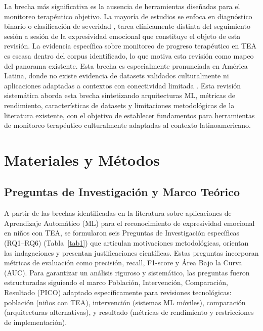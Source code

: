 \documentclass[ASNA,twocolumn]{USG}
\begin{document}
	La brecha más significativa es la ausencia de herramientas diseñadas para el
	monitoreo terapéutico objetivo. La mayoría de estudios se enfoca en diagnóstico
	binario o clasificación de severidad \cite{Alsubai2025}, tarea clínicamente distinta
	del seguimiento sesión a sesión de la expresividad emocional que constituye el objeto
	de esta revisión. La evidencia específica sobre monitoreo de progreso terapéutico en
	TEA es escasa dentro del corpus identificado, lo que motiva esta revisión como mapeo
	del panorama existente. Esta brecha es especialmente pronunciada en América Latina,
	donde no existe evidencia de datasets validados culturalmente ni aplicaciones
	adaptadas a contextos con conectividad limitada \cite{Lecciso2021,Rudovic2018}. Esta
	revisión sistemática aborda esta brecha sintetizando arquitecturas ML, métricas de
	rendimiento, características de datasets y limitaciones metodológicas de la
	literatura existente, con el objetivo de establecer fundamentos para herramientas de
	monitoreo terapéutico culturalmente adaptadas al contexto latinoamericano.
	
	\section{Materiales y Métodos}\label{sec2}
	
	\subsection{Preguntas de Investigación y Marco Teórico}\label{sec2a}
	
	A partir de las brechas identificadas en la literatura sobre aplicaciones de
	Aprendizaje Automático (ML) para el reconocimiento de expresividad emocional en
	niños con TEA, se formularon seis Preguntas de Investigación específicas
	(RQ1--RQ6) (Tabla~\ref{tab1}) que articulan motivaciones metodológicas, orientan
	las indagaciones y presentan justificaciones científicas. Estas preguntas
	incorporan métricas de evaluación como precisión, recall, F1-score y Área Bajo la
	Curva (AUC). Para garantizar un análisis riguroso y sistemático, las preguntas
	fueron estructuradas siguiendo el marco Población, Intervención, Comparación,
	Resultado (PICO) adaptado específicamente para revisiones tecnológicas: población
	(niños con TEA), intervención (sistemas ML móviles), comparación (arquitecturas
	alternativas), y resultado (métricas de rendimiento y restricciones de
	implementación).
	
\end{document}
